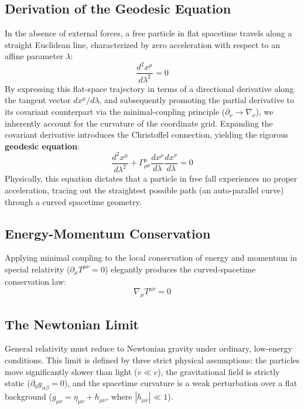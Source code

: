 \documentclass[11pt, a4paper]{report}
\begin{document}
\subsection*{Derivation of the Geodesic Equation}
In the absence of external forces, a free particle in flat spacetime travels along a straight Euclidean line, characterized by zero acceleration with respect to an affine parameter $\lambda$:
\begin{equation}
\label{eq:flat_motion}
\frac{d^{2}x^{\mu}}{d\lambda^{2}} = 0
\end{equation}
By expressing this flat-space trajectory in terms of a directional derivative along the tangent vector $dx^\mu/d\lambda$, and subsequently promoting the partial derivative to its covariant counterpart via the minimal-coupling principle ($\partial_{\nu} \rightarrow \nabla_{\nu}$), we inherently account for the curvature of the coordinate grid. Expanding the covariant derivative introduces the Christoffel connection, yielding the rigorous \textbf{geodesic equation}:
\begin{equation}
\label{eq:geodesic_derivation}
\frac{d^{2}x^{\mu}}{d\lambda^{2}} + \Gamma^{\mu}_{\rho\sigma}\frac{dx^{\rho}}{d\lambda}\frac{dx^{\sigma}}{d\lambda} = 0
\end{equation}
Physically, this equation dictates that a particle in free fall experiences no proper acceleration, tracing out the straightest possible path (an auto-parallel curve) through a curved spacetime geometry.

\subsection*{Energy-Momentum Conservation}
Applying minimal coupling to the local conservation of energy and momentum in special relativity ($\partial_{\mu}T^{\mu\nu} = 0$) elegantly produces the curved-spacetime conservation law:
\begin{equation}
\nabla_{\mu}T^{\mu\nu} = 0
\end{equation}

\subsection*{The Newtonian Limit}
General relativity must reduce to Newtonian gravity under ordinary, low-energy conditions. This limit is defined by three strict physical assumptions: the particles move significantly slower than light ($v \ll c$), the gravitational field is strictly static ($\partial_{0} g_{\alpha\beta} = 0$), and the spacetime curvature is a weak perturbation over a flat background ($g_{\mu\nu} = \eta_{\mu\nu} + h_{\mu\nu}$, where $|h_{\mu\nu}| \ll 1$).
\end{document}
